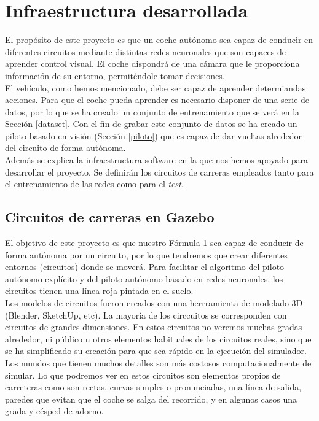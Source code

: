 \chapter{Infraestructura desarrollada}\label{cap.infraestructura}

El propósito de este proyecto es que un coche autónomo sea capaz de conducir en diferentes circuitos mediante distintas redes neuronales que son capaces de aprender control visual. El coche dispondrá de una cámara que le proporciona información de su entorno, permiténdole tomar decisiones.\\

El vehículo, como hemos mencionado, debe ser capaz de aprender determiandas acciones. Para que el coche pueda aprender es necesario disponer de una serie de datos, por lo que se ha creado un conjunto de entrenamiento que se verá en la Sección \ref{dataset}. Con el fin de grabar este conjunto de datos se ha creado un piloto basado en visión (Sección \ref{piloto}) que es capaz de dar vueltas alrededor del circuito de forma autónoma.\\

Además se explica la infraestructura software en la que nos hemos apoyado  para desarrollar el proyecto. Se definirán los circuitos de carreras empleados tanto para el entrenamiento de las redes como para el \textit{test}. 

\section{Circuitos de carreras en Gazebo}\label{modelos_circuitos}

El objetivo de este proyecto es que nuestro Fórmula 1 sea capaz de conducir de forma autónoma por un circuito, por lo que tendremos que crear diferentes entornos (circuitos) donde se moverá. Para facilitar el algoritmo del piloto autónomo explícito y del piloto autónomo basado en redes neuronales, los circuitos tienen una línea roja pintada en el suelo.\\

Los modelos de circuitos fueron creados con una herrramienta de modelado 3D (Blender, SketchUp, etc). La mayoría de los circcuitos se corresponden con circuitos de grandes dimensiones. En estos circuitos no veremos muchas gradas alrededor, ni público u otros elementos habituales de los circuitos reales, sino que se ha simplificado su creación para que sea rápido en la ejecución del simulador. Los mundos que tienen muchos detalles son más costosos computacionalmente de simular. Lo que podremos ver en estos circuitos son elementos propios de carreteras como son rectas, curvas simples o pronunciadas, una línea de salida, paredes que evitan que el coche se salga del recorrido, y en algunos casos una grada y césped de adorno.\\

